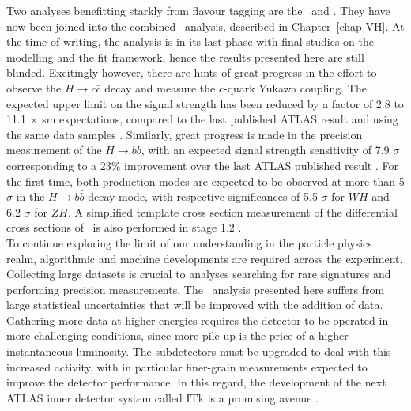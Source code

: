 Two analyses benefitting starkly from flavour tagging are the \vhb\ and \vhc. They have now been joined into the combined \vhbc\ analysis, described in Chapter~\ref{chap-VH}. At the time of writing, the analysis is in its last phase with final studies on the modelling and the fit framework, hence the results presented here are still blinded. Excitingly however, there are hints of great progress in the effort to observe the $H \rightarrow c\bar{c}$ decay and measure the $c$-quark Yukawa coupling. The expected upper limit on the signal strength has been reduced by a factor of 2.8 to 11.1 $\times$ \gls{sm} expectations, compared to the last published ATLAS result and using the same data samples \cite{Collaboration:2721696}. Similarly, great progress is made in the precision measurement of the $H \rightarrow b\bar{b}$, with an expected signal strength sensitivity of 7.9 $\sigma$ corresponding to a 23\% improvement over the last ATLAS published result \cite{ATLAS:2021wqh}. For the first time, both production modes are expected to be observed at more than 5 $\sigma$ in the $H \rightarrow b\bar{b}$ decay mode, with respective significances of 5.5 $\sigma$ for $WH$ and 6.2 $\sigma$ for $ZH$. A  simplified template cross section measurement of the differential cross sections of \vhb\ is also performed in stage 1.2 \cite{Butterworth:2015oua}. \\

To continue exploring the limit of our understanding in the particle physics realm, algorithmic and machine developments are required across the experiment. Collecting large datasets is crucial to analyses searching for rare signatures and performing precision measurements. The \vhbc\ analysis presented here suffers from large statistical uncertainties that will be improved with the addition of data. Gathering more data at higher energies requires the detector to be operated in more challenging conditions, since more pile-up is the price of a higher instantaneous luminosity. The subdetectors must be upgraded to deal with this increased activity, with in particular finer-grain measurements expected to improve the detector performance. In this regard, the development of the next ATLAS inner detector system called ITk is a promising avenue \cite{Bortoletto:2022wcx}. \\

